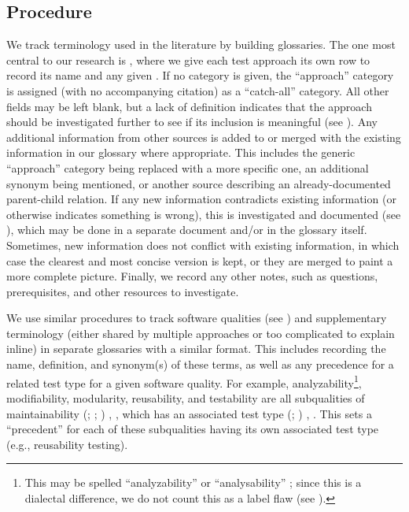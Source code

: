 \subsection{Procedure}
\label{procedure}

We track terminology used in the literature by building glossaries. The one
most central to our research is \ourApproachGlossary{}, where we give each
test approach its own row to record its name and any given \approachFields{}.
If no category is given, the ``approach'' category is assigned
(with no accompanying citation) as a ``catch-all'' category. All other fields
may be left blank, but a lack of definition indicates that the approach should
be investigated further to see if its inclusion is meaningful (see
). Any additional information from other sources is added to
or merged with the existing information in our glossary where appropriate.
This includes the generic ``approach'' category being replaced with a more
specific one, an additional synonym being mentioned, or another source
describing an already-documented parent-child relation. If any new information
contradicts existing information (or otherwise indicates something is wrong),
this is investigated and documented (see ), which may be done
in a separate document and/or in the glossary itself. Sometimes, new
information does not conflict with existing information, in which case the
clearest and most concise version is kept, or they are merged to paint a more
complete picture. Finally, we record any other notes, such as questions,
prerequisites, and other resources to investigate.

We use similar procedures to track software qualities \ifnotpaper (see
    ) \fi and supplementary terminology (either shared by
multiple approaches or too complicated to explain inline) in separate
glossaries with a similar format. This includes recording the name, definition,
and synonym(s) of these terms, as well as any precedence for a related test
type for a given software quality. For example, analyzability\footnote{
    This may be spelled ``analyzability'' \citep[p.~18]{IEEE2017} or
    ``analysability'' \citep{ISO_IEC2023a}; since this is a dialectal
    difference, we do not count this as a label flaw (see
    ).}, modifiability, modularity, reusability, and
testability are all subqualities of maintainability \ifnotpaper
    (\citealp{ISO_IEC2023a}; \citealp[Tab.~A.1]{IEEE2021};
    \citealp[p.~7\=/10]{SWEBOK2024}) \else
    \cite[p.~7\=/10]{SWEBOK2024}, \cite[Tab.~A.1]{IEEE2021},
    \cite{ISO_IEC2023a} \fi which has an associated test type
\ifnotpaper
    (\citealp[pp.~5, 22]{IEEE2022}; \citeyear[p.~38, Tab.~A.1]{IEEE2021})\else
    \cite[pp.~5, 22]{IEEE2022}, \cite[p.~38, Tab.~A.1]{IEEE2021}\fi. This sets
a ``precedent'' for each of these subqualities having its own associated test
type (e.g., reusability testing).

